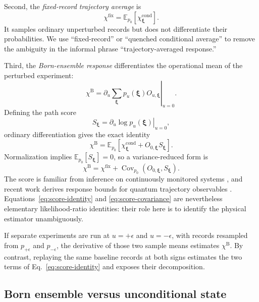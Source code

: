 \documentclass[aps,prb,onecolumn,nofootinbib,superscriptaddress]{revtex4-2}
\newcommand{\E}{\mathbb{E}}
\newcommand{\bxi}{\bm{\xi}}
\newcommand{\cond}{\mathrm{cond}}
\newcommand{\Born}{\mathrm{B}}
\newcommand{\fixed}{\mathrm{fix}}
\begin{document}
Second, the \emph{fixed-record trajectory average} is
\begin{equation}
  \chi^{\fixed}
  =\E_{p_0}\!\left[\chi_{\bxi}^{\cond}\right].
  \label{eq:fixed-average}
\end{equation}
It samples ordinary unperturbed records but does not differentiate their
probabilities.  We use ``fixed-record'' or ``quenched conditional average'' to
remove the ambiguity in the informal phrase ``trajectory-averaged response.''

Third, the \emph{Born-ensemble response} differentiates the operational mean
of the perturbed experiment:
\begin{equation}
  \chi^{\Born}
  =\left.\partial_u\sum_{\bxi}p_u(\bxi)O_{u,\bxi}\right|_{u=0}.
  \label{eq:born-response-definition}
\end{equation}
Defining the path score
\begin{equation}
  S_{\bxi}=\left.\partial_u\log p_u(\bxi)\right|_{u=0},
  \label{eq:path-score}
\end{equation}
ordinary differentiation gives the exact identity
\begin{equation}
  \boxed{
  \chi^{\Born}
  =\E_{p_0}\!\left[
       \chi_{\bxi}^{\cond}+O_{0,\bxi}S_{\bxi}
    \right].}
  \label{eq:score-identity}
\end{equation}
Normalization implies $\E_{p_0}[S_{\bxi}]=0$, so a variance-reduced form is
\begin{equation}
  \chi^{\Born}
  =\chi^{\fixed}
   +\operatorname{Cov}_{p_0}(O_{0,\bxi},S_{\bxi}).
  \label{eq:score-covariance}
\end{equation}
The score is familiar from inference on continuously monitored systems
\cite{GammelmarkMolmer2013}, and recent work derives response bounds for quantum
trajectory observables \cite{Vu2025}.  Equations~\eqref{eq:score-identity} and
\eqref{eq:score-covariance} are nevertheless elementary likelihood-ratio
identities: their role here is to identify the physical estimator unambiguously.

If separate experiments are run at $u=+\epsilon$ and $u=-\epsilon$, with
records resampled from $p_{+\epsilon}$ and $p_{-\epsilon}$, the derivative of
those two sample means estimates $\chi^{\Born}$.  By contrast, replaying the
same baseline records at both signs estimates the two terms of
Eq.~\eqref{eq:score-identity} and exposes their decomposition.

\subsection{Born ensemble versus unconditional state}
\end{document}
